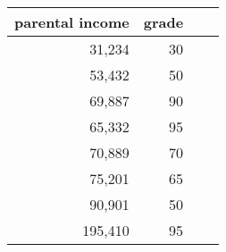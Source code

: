 \begin{tabular}{rrrr}
parental income &  grade\\ 
\hline
 \hline
 31,234 &  30\\ 
53,432 &  50\\ 
69,887 &  90\\ 
65,332 &  95\\ 
70,889 &  70\\ 
75,201 &  65\\ 
90,901 &  50\\ 
195,410 &  95\\ 
\end{tabular}
